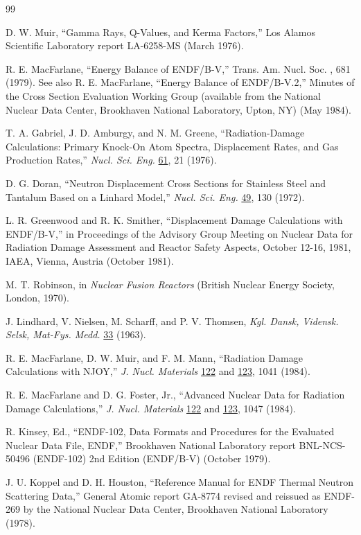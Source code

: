 \documentclass[11pt,twoside]{NJOYMan}
\begin{document}
\begin{thebibliography}{99}
\begin{singlespace}
 D. W. Muir, ``Gamma Rays, Q-Values, and Kerma Factors,''
   Los Alamos Scientific Laboratory report LA-6258-MS (March 1976).

 R. E. MacFarlane, ``Energy Balance of ENDF/B-V,''
   Trans. Am. Nucl. Soc. , 681 (1979).  See also
   R. E. MacFarlane, ``Energy Balance of ENDF/B-V.2,''
   Minutes of the Cross Section Evaluation Working Group
   (available from the National Nuclear Data Center, Brookhaven
   National Laboratory, Upton, NY) (May 1984).

 T. A. Gabriel, J. D. Amburgy, and N. M. Greene,
   ``Radiation-Damage Calculations: Primary Knock-On Atom Spectra,
   Displacement Rates, and Gas Production Rates,''
   {\it Nucl. Sci. Eng.} \underline{61}, 21 (1976).

 D. G. Doran, ``Neutron Displacement Cross Sections for
   Stainless Steel and Tantalum Based on a Linhard Model,'' {\it Nucl. Sci.
   Eng.} \underline{49}, 130 (1972).

 L. R. Greenwood and R. K. Smither, ``Displacement
   Damage Calculations with ENDF/B-V,'' in Proceedings of the Advisory Group
   Meeting on Nuclear Data for Radiation Damage Assessment and Reactor
   Safety Aspects, October 12-16, 1981, IAEA, Vienna, Austria (October 1981).

 M. T. Robinson, in {\it Nuclear Fusion Reactors}
   (British Nuclear Energy Society, London, 1970).

 J. Lindhard, V. Nielsen, M. Scharff, and P. V. Thomsen,
   {\it Kgl. Dansk, Vidensk. Selsk, Mat-Fys. Medd.} \underline{33} (1963).

 R. E. MacFarlane, D. W. Muir, and F. M. Mann,
   ``Radiation Damage Calculations with NJOY,''
   {\it J. Nucl. Materials} \underline{122} and \underline{123},
   1041 (1984).

 R. E. MacFarlane and D. G. Foster, Jr.,
   ``Advanced Nuclear Data for Radiation Damage Calculations,''
   {\it J. Nucl. Materials} \underline{122} and \underline{123},
   1047 (1984).

 R. Kinsey, Ed., ``ENDF-102, Data Formats and Procedures
   for the Evaluated Nuclear Data File, ENDF,'' Brookhaven National
   Laboratory report BNL-NCS-50496 (ENDF-102) 2nd Edition
   (ENDF/B-V) (October 1979).

 J. U. Koppel and D. H. Houston, ``Reference Manual
   for ENDF Thermal Neutron Scattering Data,'' General Atomic report
   GA-8774 revised and reissued as ENDF-269 by the National Nuclear Data
   Center, Brookhaven National Laboratory (1978).


\end{singlespace}
\end{thebibliography}
\end{document}
